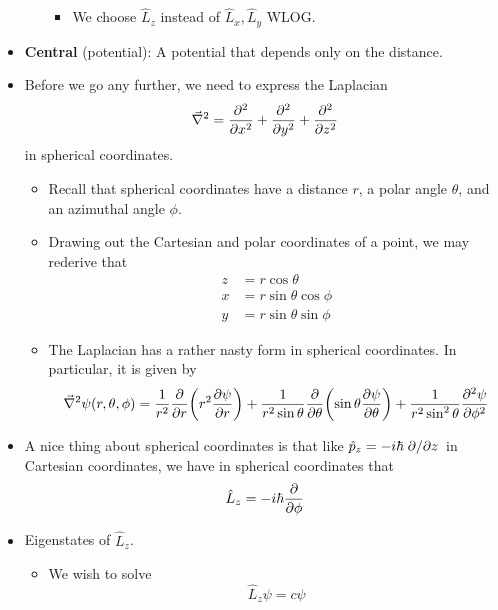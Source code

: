 \documentclass[../notes.tex]{subfiles}
\begin{document}
\begin{itemize}
\begin{itemize}
\begin{itemize}
            \item We choose $\hat{L}_z$ instead of $\hat{L}_x,\hat{L}_y$ WLOG.
        \end{itemize}
    \end{itemize}
    \item \textbf{Central} (potential): A potential that depends only on the distance.
    \item Before we go any further, we need to express the Laplacian
    \begin{equation*}
        \vec{\nabla}^2 = \pdv[2]{x}+\pdv[2]{y}+\pdv[2]{z}
    \end{equation*}
    in spherical coordinates.
    \begin{itemize}
        \item Recall that spherical coordinates have a distance $r$, a polar angle $\theta$, and an azimuthal angle $\phi$.
        \item Drawing out the Cartesian and polar coordinates of a point, we may rederive that
        \begin{align*}
            z &= r\cos\theta\\
            x &= r\sin\theta\cos\phi\\
            y &= r\sin\theta\sin\phi
        \end{align*}
        \item The Laplacian has a rather nasty form in spherical coordinates. In particular, it is given by
        \begin{equation*}
            \vec{\nabla}^2\psi(r,\theta,\phi) = \frac{1}{r^2}\pdv{r}(r^2\pdv{\psi}{r})+\frac{1}{r^2\sin\theta}\pdv{\theta}(\sin\theta\pdv{\psi}{\theta})+\frac{1}{r^2\sin^2\theta}\pdv[2]{\psi}{\phi}
        \end{equation*}
    \end{itemize}
    \item A nice thing about spherical coordinates is that like $\hat{p}_z=-i\hbar\pdv*{z}$ in Cartesian coordinates, we have in spherical coordinates that
    \begin{equation*}
        \hat{L}_z = -i\hbar\pdv{\phi}
    \end{equation*}
    \item Eigenstates of $\hat{L}_z$.
    \begin{itemize}
        \item We wish to solve
        \begin{equation*}
            \hat{L}_z\psi = c\psi
        \end{equation*}

\end{itemize}
\end{itemize}
\end{document}
